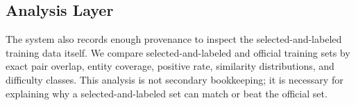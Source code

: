 \subsection{Analysis Layer}

The system also records enough provenance to inspect the selected-and-labeled training data itself. We compare selected-and-labeled and official training sets by exact pair overlap, entity coverage, positive rate, similarity distributions, and difficulty classes. This analysis is not secondary bookkeeping; it is necessary for explaining why a selected-and-labeled set can match or beat the official set.
